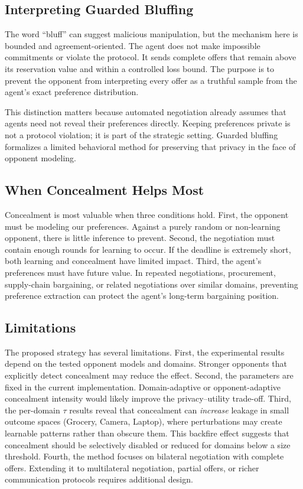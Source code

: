 \documentclass[runningheads]{llncs}
\begin{document}
\subsection{Interpreting Guarded Bluffing}

The word ``bluff'' can suggest malicious manipulation, but the mechanism here is bounded and agreement-oriented. The agent does not make impossible commitments or violate the protocol. It sends complete offers that remain above its reservation value and within a controlled loss bound. The purpose is to prevent the opponent from interpreting every offer as a truthful sample from the agent's exact preference distribution.

This distinction matters because automated negotiation already assumes that agents need not reveal their preferences directly. Keeping preferences private is not a protocol violation; it is part of the strategic setting. Guarded bluffing formalizes a limited behavioral method for preserving that privacy in the face of opponent modeling.

\subsection{When Concealment Helps Most}

Concealment is most valuable when three conditions hold. First, the opponent must be modeling our preferences. Against a purely random or non-learning opponent, there is little inference to prevent. Second, the negotiation must contain enough rounds for learning to occur. If the deadline is extremely short, both learning and concealment have limited impact. Third, the agent's preferences must have future value. In repeated negotiations, procurement, supply-chain bargaining, or related negotiations over similar domains, preventing preference extraction can protect the agent's long-term bargaining position.

\subsection{Limitations}

The proposed strategy has several limitations. First, the experimental results depend on the tested opponent models and domains. Stronger opponents that explicitly detect concealment may reduce the effect. Second, the parameters are fixed in the current implementation. Domain-adaptive or opponent-adaptive concealment intensity would likely improve the privacy--utility trade-off. Third, the per-domain $\tau$ results reveal that concealment can \emph{increase} leakage in small outcome spaces (Grocery, Camera, Laptop), where perturbations may create learnable patterns rather than obscure them. This backfire effect suggests that concealment should be selectively disabled or reduced for domains below a size threshold. Fourth, the method focuses on bilateral negotiation with complete offers. Extending it to multilateral negotiation, partial offers, or richer communication protocols requires additional design.
\end{document}
